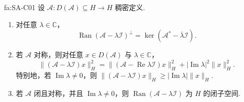 \begin{FAProposition}[C][对称算子的值域与非实参数工具]{fa:SA-C01}
设 \(\displaystyle\mathcal A:D(\mathcal A)\subseteq H\to H\) 稠密定义.
\begin{enumerate}[label=\textnormal{(\roman*)}]
\item 对任意 \(\displaystyle\lambda\in\mathbb C\)，
\[
\operatorname{Ran}(\mathcal A-\lambda\mathcal I)^\perp
=
\ker(\mathcal A^*-\overline\lambda\mathcal I).
\]
\item 若 \(\displaystyle\mathcal A\) 对称，则对任意 \(\displaystyle x\in D(\mathcal A)\) 与 \(\displaystyle\lambda\in\mathbb C\)，
\[
\|(\mathcal A-\lambda\mathcal I)x\|_H^2
=
\|(\mathcal A-\operatorname{Re}\lambda\mathcal I)x\|_H^2
+
|\operatorname{Im}\lambda|^2\|x\|_H^2.
\]
特别地，若 \(\displaystyle\operatorname{Im}\lambda\neq0\)，则
\(\displaystyle \|(\mathcal A-\lambda\mathcal I)x\|_H \geqslant |\operatorname{Im}\lambda|\|x\|_H.\)
\item 若 \(\displaystyle\mathcal A\) 闭且对称，并且 \(\displaystyle\operatorname{Im}\lambda\neq0\)，则 \(\displaystyle\operatorname{Ran}(\mathcal A-\lambda\mathcal I)\) 为 \(\displaystyle H\) 的闭子空间.
\end{enumerate}
\end{FAProposition}

